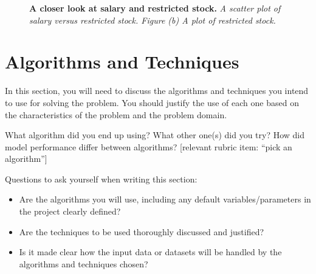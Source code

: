 \documentclass[twoside,openright,titlepage,numbers=noenddot,headinclude,%
               footinclude=true,cleardoublepage=empty,abstractoff,BCOR=5mm,%
               paper=a4,fontsize=11pt,ngerman,american]{scrreprt}
\numberwithin{theorem}{chapter}
\numberwithin{definition}{chapter}
\numberwithin{algorithm}{chapter}
\numberwithin{figure}{chapter}
\numberwithin{table}{chapter}
\numberwithin{equation}{chapter}
\begin{document}
\begin{figure}[!hbtp]
\centering
    
    \caption{\textbf{A closer look at salary and restricted stock.} \textit{A scatter plot of salary versus restricted stock. Figure (b) A plot of restricted stock.}}
\end{figure}

\clearpage
\section*{Algorithms and Techniques}

In this section, you will need to discuss the algorithms and techniques you intend to use for solving the problem. You should justify the use of each one based on the characteristics of the problem and the problem domain. 

What algorithm did you end up using? What other one(s) did you try? How did model performance differ between algorithms?  [relevant rubric item: ``pick an algorithm'']

Questions to ask yourself when writing this section:
\begin{itemize}%
\item Are the algorithms you will use, including any default variables/parameters in the project clearly defined?
\item Are the techniques to be used thoroughly discussed and justified?
\item Is it made clear how the input data or datasets will be handled by the algorithms and techniques chosen?
\end{itemize}
\end{document}
